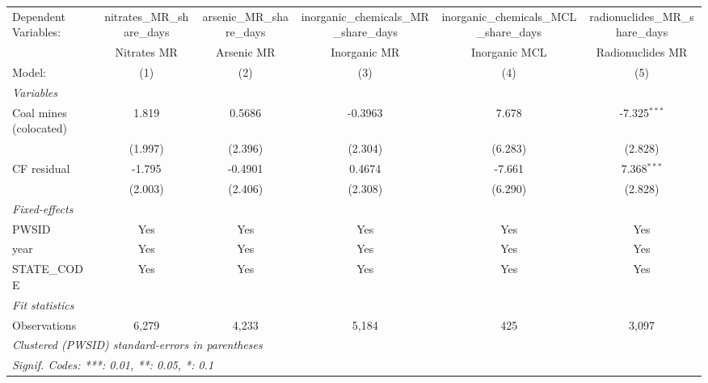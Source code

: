 
\begingroup
\centering
\begin{tabular}{lccccc}
   \tabularnewline \midrule \midrule
   Dependent Variables:   & nitrates\_MR\_share\_days    & arsenic\_MR\_share\_days    & inorganic\_chemicals\_MR\_share\_days     & inorganic\_chemicals\_MCL\_share\_days     & radionuclides\_MR\_share\_days\\     
                          & Nitrates MR                  & Arsenic MR                  & Inorganic MR                              & Inorganic MCL                              & Radionuclides MR \\   
   Model:                 & (1)                          & (2)                         & (3)                                       & (4)                                        & (5)\\  
   \midrule
   \emph{Variables}\\
   Coal mines (colocated) & 1.819                        & 0.5686                      & -0.3963                                   & 7.678                                      & -7.325$^{***}$\\   
                          & (1.997)                      & (2.396)                     & (2.304)                                   & (6.283)                                    & (2.828)\\   
   CF residual            & -1.795                       & -0.4901                     & 0.4674                                    & -7.661                                     & 7.368$^{***}$\\   
                          & (2.003)                      & (2.406)                     & (2.308)                                   & (6.290)                                    & (2.828)\\   
   \midrule
   \emph{Fixed-effects}\\
   PWSID                  & Yes                          & Yes                         & Yes                                       & Yes                                        & Yes\\  
   year                   & Yes                          & Yes                         & Yes                                       & Yes                                        & Yes\\  
   STATE\_CODE            & Yes                          & Yes                         & Yes                                       & Yes                                        & Yes\\  
   \midrule
   \emph{Fit statistics}\\
   Observations           & 6,279                        & 4,233                       & 5,184                                     & 425                                        & 3,097\\  
   \midrule \midrule
   \multicolumn{6}{l}{\emph{Clustered (PWSID) standard-errors in parentheses}}\\
   \multicolumn{6}{l}{\emph{Signif. Codes: ***: 0.01, **: 0.05, *: 0.1}}\\
\end{tabular}
 
